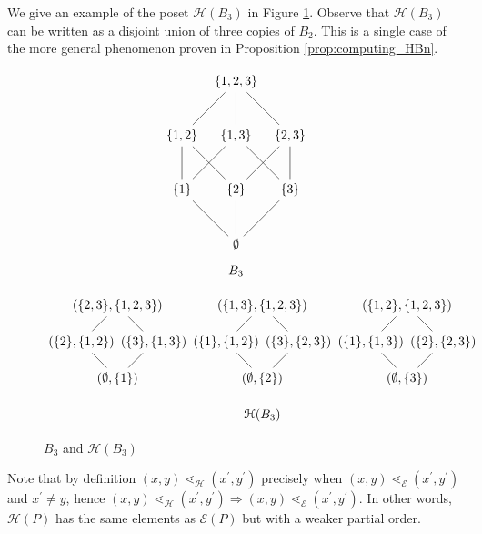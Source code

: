 \documentclass[smallextended, envcountsame, numbook]{svjour3}
\numberwithin{equation}{section}
\begin{document}
\begin{example}
\label{eg:3boolean}
We give an example of the poset $\mathcal H(B_3)$ in Figure \ref{fig:3boolean}. Observe that $\mathcal H(B_3)$ can be written as a disjoint union of three copies of $B_2$. This is a single case of the more general phenomenon proven in Proposition \ref{prop:computing_HBn}.
\end{example}

\begin{figure}[h!]
\[\begin{tikzpicture}[scale = 1.5]
  \node (0) at (0,0) {$\emptyset$};
  \node (1) at (-1,1) {$\{1\}$};
  \node (2) at (0,1) {$\{2\}$};
  \node (3) at (1,1) {$\{3\}$};
  \node (4) at (-1,2) {$\{1,2\}$};
  \node (5) at (0,2) {$\{1,3\}$};
  \node (6) at (1,2) {$\{2,3\}$};
  \node (7) at (0,3) {$\{1,2,3\}$};
  \draw (0)--(1);
  \draw (0)--(2);
  \draw (0)--(3);
  \draw (1)--(4);
  \draw (1)--(5);
  \draw (2)--(4);
  \draw (2)--(6);
  \draw (3)--(5);
  \draw (3)--(6);
  \draw (4)--(7);
  \draw (5)--(7);
  \draw (6)--(7);
  \node (8) at (0,-.5) {$B_3$};
\end{tikzpicture} \]

\vspace*{0.3in}

\[\begin{tikzpicture}[scale = 1]
  \node (0) at (0,0) {$(\emptyset,\{1\})$};
  \node (1) at (4,0) {$(\emptyset,\{2\})$};
  \node (2) at (8,0) {$(\emptyset,\{3\})$};
  \node (3) at (3,1) {$(\{1\},\{1,2\})$};
  \node (4) at (7,1) {$(\{1\},\{1,3\})$};
  \node (5) at (-1,1) {$(\{2\},\{1,2\})$};
  \node (6) at (9,1) {$(\{2\},\{2,3\})$};
  \node (7) at (1,1) {$(\{3\},\{1,3\})$};
  \node (8) at (5,1) {$(\{3\},\{2,3\})$};
  \node (9) at (8,2) {$(\{1,2\},\{1,2,3\})$};
  \node (10) at (4,2) {$(\{1,3\},\{1,2,3\})$};
  \node (11) at (0,2) {$(\{2,3\},\{1,2,3\})$};
  \draw (0)--(5)--(11)--(7)--(0);
  \draw (1)--(3)--(10)--(8)--(1);
  \draw (2)--(4)--(9)--(6)--(2);
  \node (12) at (4,-1) {$\mathcal{H}(B_3)$};
\end{tikzpicture}\]
\caption{\label{fig:3boolean} $B_3$ and $\mathcal H (B_3)$}
\end{figure}


\begin{remark}\label{rem:order_containment}
Note that by definition $(x,y)\lessdot_{\mathcal{H}} (x^\prime,y^\prime)$ precisely when $(x,y)\lessdot_{\mathcal{E}} (x^\prime,y^\prime)$ and $x^\prime\neq y$, hence $(x, y)\lessdot_{\mathcal{H}} (x^\prime, y^\prime) \Rightarrow (x, y)\lessdot_{\mathcal E} (x^\prime, y^\prime)$.  In other words, $\mathcal{H}(P)$ has the same elements as $\mathcal{E}(P)$ but with a weaker partial order.
\end{remark}
\end{document}
